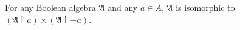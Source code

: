 For any Boolean algebra $\mathfrak{A}$ and any $a \in A$, $\mathfrak{A}$ is isomorphic to $(\mathfrak{A} \upharpoonright a) \times (\mathfrak{A} \upharpoonright -a)$.
